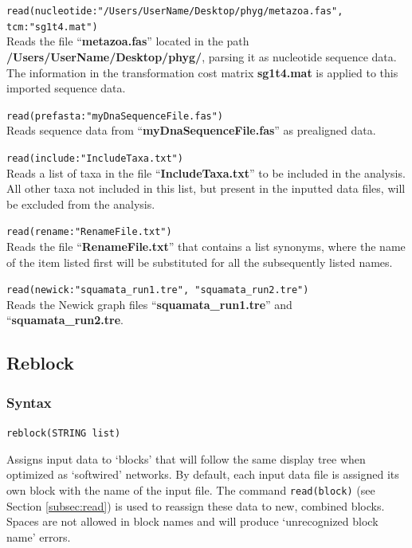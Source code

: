 	\begin{example}
		\item{\texttt{read(nucleotide:"/Users/UserName/Desktop/phyg/metazoa.fas", 
		tcm:"sg1t4.mat")}\\ Reads the file ``\textbf{metazoa.fas}'' located in the path 
		\textbf{/Users/UserName/Desktop/phyg/}, parsing it as nucleotide sequence 
		data. The information in the transformation cost matrix \textbf{sg1t4.mat} 
		is applied to this imported sequence data.}
		
		\item{\texttt{read(prefasta:"myDnaSequenceFile.fas")}\\ Reads sequence data from 
		``\textbf{myDnaSequenceFile.fas}'' as prealigned data.}
		
		\item{\texttt{read(include:"IncludeTaxa.txt")}\\ Reads a list of taxa in the file 
		``\textbf{IncludeTaxa.txt}'' to be included in the analysis. All other taxa not included 
		in this list, but present in the inputted data files, will be excluded from the analysis.}
		
		\item{\texttt{read(rename:"RenameFile.txt")}\\ Reads the file ``\textbf{RenameFile.txt}'' 
		that contains a list synonyms, where the name of the item listed first will be substituted 
		for all the subsequently listed names. }
		
		\item{\texttt{read(newick:"squamata\_run1.tre", "squamata\_run2.tre")}\\ Reads the
		Newick graph files ``\textbf{squamata\_run1.tre}'' and ``\textbf{squamata\_run2.tre}.}
		
	\end{example}
		
\subsection{Reblock}
\label{subsec:reblock}
	\subsubsection{Syntax}
		\texttt{reblock(STRING list)}
	
	\begin{phygdescription}
		{Assigns input data to `blocks' that will follow the same display tree when optimized
		as `softwired' networks. By default, each input data file is assigned its own block with 
		the name of the input file. The command \texttt{read(block)} (see Section \ref{subsec:read}) 
		is used to reassign these data to new, combined blocks. Spaces are not allowed in 
		block names and will produce `unrecognized block name' errors.} 
	\end{phygdescription}
	

